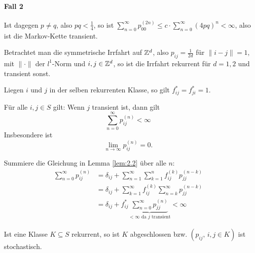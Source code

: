 \documentclass[a4paper,twoside,DIV15,BCOR12mm]{scrbook}
\begin{document}
\begin{beispiel}
\paragraph{Fall 2} Ist dagegen $p\ne q$, also $pq<\frac14$, so ist $\sum_{n=0}^\infty p_{00}^{(2n)} \le c\cdot\sum_{n=0}^\infty (4pq)^n < \infty$, also ist die Markov-Kette transient.
\end{beispiel}

\begin{bemerkung}
Betrachtet man die symmetrische Irrfahrt auf $\mathbb{Z}^d$, also $p_{ij}= \frac1{2d}$ für $\|i-j\|=1$, mit $\|\cdot\|$ der $l^1$-Norm und $i,j\in \mathbb{Z}^d$, so ist die Irrfahrt rekurrent für $d=1,2$ und transient sonst.
\end{bemerkung}

\begin{lemma}
Liegen $i$ und $j$ in der selben rekurrenten Klasse, so gilt $f^*_{ij} = f^*_{ji}= 1$.
\label{lem:2.5}
\end{lemma}

\begin{lemma}
Für alle $i,j\in S$ gilt: Wenn $j$ transient ist, dann gilt
\[
\sum_{n=0}^\infty p_{ij}^{(n)} < \infty
\]
Insbesondere ist 
\[
\lim_{n\to\infty} p_{ij}^{(n)} = 0.
\]
\label{lem:2.6}
\end{lemma}

\begin{beweis}
Summiere die Gleichung in Lemma \ref{lem:2.2} über alle $n$:
\begin{align*}
\sum_{n=0}^\infty p_{ij}^{(n)} &=
\delta_{ij} + \sum_{n=1}^\infty \sum_{k=1}^n f_{ij}^{(k)}p_{jj}^{(n-k)} \\
&= \delta_{ij} + \sum_{k=1}^\infty f_{ij}^{(k)} \sum_{n=k}^\infty p_{jj}^{(n-k)} \\
&= \delta_{ij} + f_{ij}^* \underbrace{\sum_{n=0}^\infty p_{jj}^{(n)}}_{<\infty\text{ da $j$ transient}}  <\infty
\end{align*}
\end{beweis}

\begin{satz}
Ist eine Klasse $K\subseteq S$ rekurrent, so ist $K$ abgeschlossen bzw. $(p_{ij},\, i,j\in K)$ ist stochastisch.
\end{satz}
\end{document}
